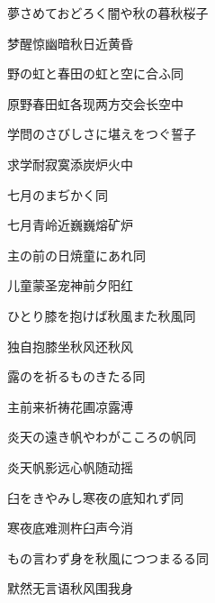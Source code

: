 \begin{haiku}
    {\FH 夢さめておどろく闇や秋の暮}\hfill{\FH 秋桜子}

    {\FK 梦醒惊幽暗秋日近黄昏}
\end{haiku}

\begin{haiku}
    {\FH 野の虹と春田の虹と空に合ふ}\hfill{\FH 同}

    {\FK 原野春田虹各现两方交会长空中}
\end{haiku}

\begin{haiku}
    {\FH 学問のさびしさに堪えをつぐ}\hfill{\FH 誓子}

    {\FK 求学耐寂寞添炭炉火中}
\end{haiku}

\begin{haiku}
    {\FH 七月のまぢかく}\hfill{\FH 同}

    {\FK 七月青岭近巍巍熔矿炉}
\end{haiku}

\begin{haiku}
    {\FH 主の前の日焼童にあれ}\hfill{\FH 同}

    {\FK 儿童蒙圣宠神前夕阳红}
\end{haiku}

\begin{haiku}
    {\FH ひとり膝を抱けば秋風また秋風}\hfill{\FH 同}

    {\FK 独自抱膝坐秋风还秋风}
\end{haiku}

\begin{haiku}
    {\FH 露のを祈るものきたる}\hfill{\FH 同}

    {\FK 主前来祈祷花圃凉露溥}
\end{haiku}

\begin{haiku}
    {\FH 炎天の遠き帆やわがこころの帆}\hfill{\FH 同}

    {\FK 炎天帆影远心帆随动摇}
\end{haiku}

\begin{haiku}
    {\FH 臼をきやみし寒夜の底知れず}\hfill{\FH 同}

    {\FK 寒夜底难测杵臼声今消}
\end{haiku}

\begin{haiku}
    {\FH もの言わず身を秋風につつまるる}\hfill{\FH 同}

    {\FK 默然无言语秋风围我身}
\end{haiku}

